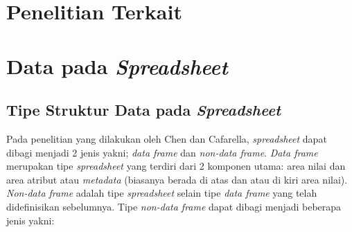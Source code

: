 
\section{Penelitian Terkait}

\section{Data pada \textit{Spreadsheet}} \label{JenisSpreadsheet}

\subsection{Tipe Struktur Data pada \textit{Spreadsheet}}
Pada penelitian yang dilakukan oleh Chen dan Cafarella, \textit{spreadsheet} dapat dibagi menjadi 2 jenis yakni; \textit{data frame} dan \textit{non-data frame}. \textit{Data frame} merupakan tipe \textit{spreadsheet} yang terdiri dari 2 komponen utama: area nilai dan area atribut atau \textit{metadata} (biasanya berada di atas dan atau di kiri area nilai). \textit{Non-data frame} adalah tipe \textit{spreadsheet} selain tipe \textit{data frame} yang telah didefinisikan sebelumnya. Tipe \textit{non-data frame} dapat dibagi menjadi beberapa jenis yakni:

